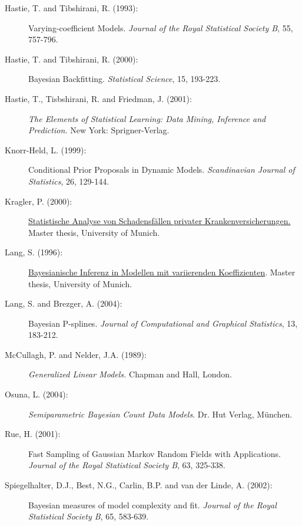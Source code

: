 \begin{description}
\item[Hastie, T. and Tibshirani, R. (1993):] Varying-coefficient Models.
{\em Journal of the Royal Statistical Society B}, 55, 757-796.

\item[Hastie, T. and Tibshirani, R. (2000):] Bayesian Backfitting. {\em Statistical Science}, 15, 193-223.

\item[Hastie, T., Tisbshirani, R. and Friedman, J. (2001):] {\em The Elements of Statistical Learning: Data Mining,
Inference and Prediction.} New York: Sprigner-Verlag.

\item[Knorr-Held, L. (1999):]
Conditional Prior Proposals in Dynamic Models. {\em Scandinavian
Journal of Statistics}, 26, 129-144.

\item[Kragler, P. (2000):] \href{http://www.scor.fr/us/2_laureat.asp?pays=2}
{Statistische Analyse von Schadensf\"allen privater
Krankenversicherungen.} Master thesis, University of Munich.


\item[Lang, S. (1996):]
\href{mailto:lang@stat.uni-muenchen.de} {Bayesianische Inferenz in
Modellen mit variierenden Koeffizienten}. Master thesis, University of Munich.


\item[Lang, S. and Brezger, A. (2004):]
Bayesian P-splines. {\em Journal of Computational and Graphical Statistics}, 13, 183-212.

\item[McCullagh, P. and Nelder, J.A. (1989):] {\em Generalized Linear Models.} Chapman and Hall, London.

\item[Osuna, L. (2004):] {\it Semiparametric Bayesian Count Data
Models}. Dr. Hut Verlag, M\"{u}nchen.

\item[Rue, H. (2001):] Fast Sampling of Gaussian Markov Random Fields with Applications.
{\em Journal of the Royal Statistical Society B}, 63, 325-338.

\item[Spiegelhalter, D.J., Best, N.G., Carlin, B.P. and van der Linde, A. (2002):]
Bayesian measures of model complexity and fit. {\em Journal of the
Royal Statistical Society B}, 65, 583-639.

\end{description}

